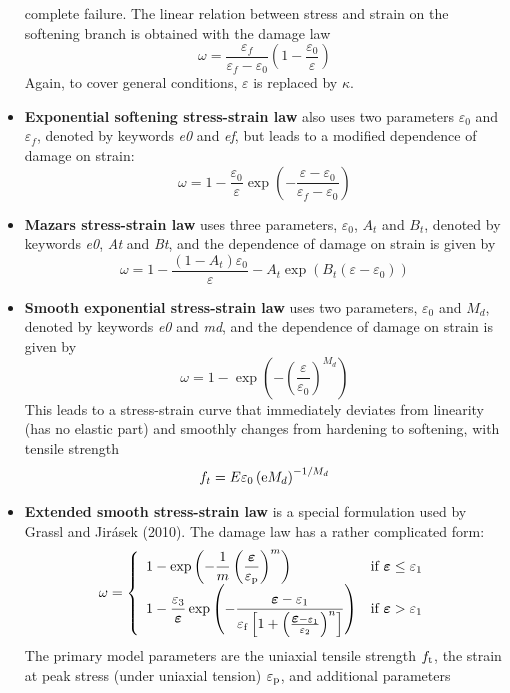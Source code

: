 \documentclass[a4paper]{article}
\newcommand{\mbf}[1]{\mbox{\boldmath$#1$}}
\newcommand{\eps} {\mbf{\varepsilon}}
\begin{document}
\begin{itemize}
complete failure. The linear relation between stress and strain on the
softening branch is obtained with the damage law
$$
\omega =\frac{\varepsilon_f}{\varepsilon_f-\varepsilon_0}\left(1-\frac{\varepsilon_0}{\varepsilon}\right)
$$
Again, to cover general conditions, $\varepsilon$ is replaced by $\kappa$.
\item
{\bf Exponential softening stress-strain law} also uses two parameters
 $\varepsilon_0$ and $\varepsilon_f$, denoted by keywords {\it e0}
and {\it ef}, but leads to a modified dependence of damage on strain:
$$
\omega =1-\frac{\varepsilon_0}{\varepsilon}\exp\left(-\frac{\varepsilon-\varepsilon_0}{\varepsilon_f-\varepsilon_0}\right)
$$
\item
{\bf Mazars stress-strain law} uses three parameters, $\varepsilon_0$,
$A_t$ and $B_t$, denoted by keywords {\it e0}, {\it At} and {\it Bt}, and the
dependence of damage on strain is given by
$$
\omega =1-\frac{(1-A_t)\varepsilon_0}{\varepsilon}-A_t\exp\left(B_t(\varepsilon-\varepsilon_0)\right)
$$
\item
{\bf Smooth exponential stress-strain law} uses two parameters, $\varepsilon_0$
and $M_d$, denoted by keywords {\it e0} and {\it md}, and the
dependence of damage on strain is given by
$$
\omega = 1-\exp\left(-\left(\frac{\varepsilon}{\varepsilon_0}\right)^{M_d}\right)
$$
This leads to a stress-strain curve that immediately deviates from linearity
(has no elastic part) and smoothly changes from hardening to softening,
with tensile strength
$$
f_t = E\varepsilon_0\left({\rm e}M_d\right)^{-1/M_d}
$$
\item
{\bf Extended smooth stress-strain law} is a special formulation used
by Grassl and Jir\'{a}sek (2010). The damage law has a rather complicated form:
\begin{equation} \label{eq:damageEvol}
\omega = \left \{ \begin{array}{ll} 
1-\exp\left(-\displaystyle\frac{1}{m}\left(\dfrac{\eps}{\varepsilon_{\rm p}}\right)^m\right) & \mbox{if $\eps \leq \varepsilon_1$}\\[2mm]
1- \dfrac{\varepsilon_3}{\eps} \exp \left(- \dfrac{\eps- \varepsilon_1}{\varepsilon_{\rm f} \left[1+ \left(\frac{\eps-\varepsilon_1}{\varepsilon_2}\right)^n\right]}\right) & \mbox{if $\eps > \varepsilon_1$} \end{array} \right.
\end{equation}
The primary model parameters are the uniaxial tensile strength $f_{\rm t}$,
the strain at peak stress (under uniaxial tension) $\varepsilon_{\rm p}$, and additional parameters

\end{itemize}
\end{document}

